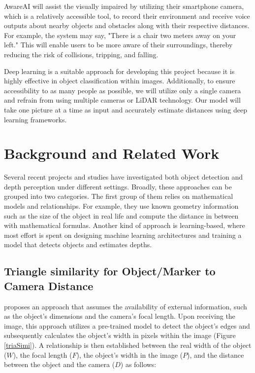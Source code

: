 \documentclass{article} %
\begin{document}
AwareAI will assist the visually impaired by utilizing their smartphone camera, which is a relatively accessible tool, to record their environment and receive voice outputs about nearby objects and obstacles along with their respective distances. For example, the system may say, "There is a chair two meters away on your left." This will enable users to be more aware of their surroundings, thereby reducing the risk of collisions, tripping, and falling.

Deep learning is a suitable approach for developing this project because it is highly effective in object classification within images. Additionally, to ensure accessibility to as many people as possible, we will utilize only a single camera and refrain from using multiple cameras or LiDAR technology. Our model will take one picture at a time as input and accurately estimate distances using deep learning frameworks.





\section{Background and Related Work}

Several recent projects and studies have investigated both object detection and depth perception under different settings. Broadly, these approaches can be grouped into two categories. The first group of them relies on mathematical models and relationships. For example, they use known geometry information such as the size of the object in real life and compute the distance in between with mathematical formulas. Another kind of approach is learning-based, where most effort is spent on designing machine learning architectures and training a model that detects objects and estimates depths.


\subsection{ Triangle similarity for Object/Marker to Camera Distance}


\cite{PyImage_Triangle} proposes an approach that assumes the availability of external information, such as the object's dimensions and the camera's focal length. Upon receiving the image, this approach utilizes a pre-trained model to detect the object's edges and subsequently calculates the object's width in pixels within the image (Figure  \ref{triaSimi}). A relationship is then established between the real width of the object ($\displaystyle W$), the focal length ($\displaystyle F$), the object's width in the image ($\displaystyle P$), and the distance between the object and the camera ($\displaystyle D$) as follows:
\end{document}
